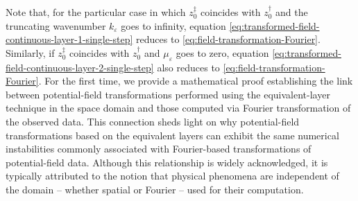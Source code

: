 Note that, for the particular case in which $z^{\ddagger}_{0}$ coincides with $z^{\dagger}_{0}$ and 
the truncating wavenumber $k_{\varepsilon}$ goes to infinity, equation 
\ref{eq:transformed-field-continuous-layer-1-single-step} reduces to \ref{eq:field-transformation-Fourier}.
Similarly, if $z^{\ddagger}_{0}$ coincides with $z^{\dagger}_{0}$ and $\mu_{\varepsilon}$ goes to zero,
equation \ref{eq:transformed-field-continuous-layer-2-single-step} also reduces to \ref{eq:field-transformation-Fourier}.
For the first time, we provide a mathematical proof establishing the link between
potential-field transformations performed using the equivalent-layer technique in 
the space domain and those computed via Fourier transformation of the observed data.
This connection sheds light on why potential-field transformations based on the
equivalent layers can exhibit the same numerical instabilities commonly associated
with Fourier-based transformations of potential-field data. Although this
relationship is widely acknowledged, it is typically attributed to the notion that
physical phenomena are independent of the domain -- whether spatial or Fourier --
used for their computation.